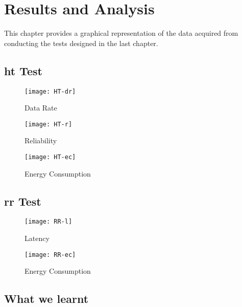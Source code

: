 \chapter{Results and Analysis}
This chapter provides a graphical representation of the data acquired from conducting the tests designed in the last chapter. 

\section{\acrlong{ht} Test}


\begin{figure}[h]
\texttt{[image: HT-dr]}
\caption{Data Rate}
\end{figure}

\begin{figure}[h]
\texttt{[image: HT-r]}
\caption{Reliability}
\end{figure}

\begin{figure}[h]
\texttt{[image: HT-ec]}
\caption{Energy Consumption}
\end{figure}

\section{\acrlong{rr} Test}


\begin{figure}[h]
\texttt{[image: RR-l]}
\caption{Latency}
\end{figure}

\begin{figure}[h]
\texttt{[image: RR-ec]}
\caption{Energy Consumption}
\end{figure}

\section{What we learnt}